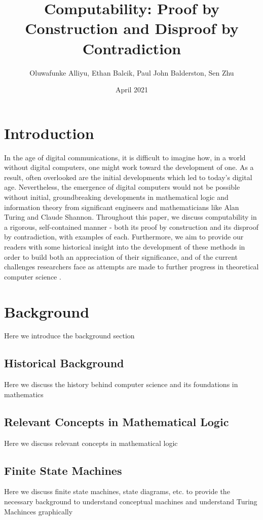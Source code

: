 \documentclass{article}
\title{Computability: Proof by Construction and Disproof by Contradiction}
\author{Oluwafunke Alliyu, Ethan Balcik, Paul John Balderston, Sen Zhu}
\date{April 2021}
\begin{document}
\maketitle

\section{Introduction}
In the age of digital communications, it is difficult to imagine how, in a world without digital computers, one might work toward the development of one.  As a result, often overlooked are the initial developments which led to today's digital age.  Nevertheless, the emergence of digital computers would not be possible without initial, groundbreaking developments in mathematical logic and information theory from significant engineers and mathematicians like Alan Turing and Claude Shannon.  Throughout this paper, we discuss computability in a rigorous, self-contained manner - both its proof by construction and its disproof by contradiction, with examples of each.  Furthermore, we aim to provide our readers with some historical insight into the development of these methods in order to build both an appreciation of their significance, and of the current challenges researchers face as attempts are made to further progress in theoretical computer science \cite{1}.

\section{Background}
Here we introduce the background section
\subsection{Historical Background}
Here we discuss the history behind computer science and its foundations in mathematics
\subsection{Relevant Concepts in Mathematical Logic}
Here we discuss relevant concepts in mathematical logic
\subsection{Finite State Machines}
Here we discuss finite state machines, state diagrams, etc. to provide the necessary background to understand conceptual machines and understand Turing Machinces graphically
\end{document}
